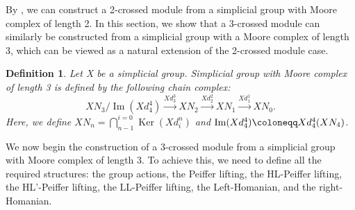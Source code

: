 \documentclass{tac}
\newtheorem{dfn}{Definition}
\begin{document}
By \cite{AkcaPak2010}, we can construct a 2-crossed module from a simplicial group with Moore complex of length 2. In this section, we show that a 3-crossed module can similarly be constructed from a simplicial group with a Moore complex of length 3, which can be viewed as a natural extension of the 2-crossed module case.

\begin{dfn}
Let X be a simplicial group. Simplicial group with Moore complex of length 3 is defined by the following chain complex:
\[
XN_3/{\operatorname{Im} (Xd^4_4)} \xrightarrow{Xd^3_3} XN_2 \xrightarrow{Xd^2_2} XN_1 \xrightarrow{Xd^1_1} XN_0 .
\]
Here, we define $XN_n = \displaystyle\bigcap_{n-1}^{i=0} \operatorname{Ker}(Xd_i^n)$ and ${\rm Im}(Xd^4_4) \coloneqq Xd^4_4(XN_4)$.
\end{dfn}
 
 We now begin the construction of a 3-crossed module from a simplicial group with Moore complex of length 3. To achieve this, we need to define all the required structures: the group actions, the Peiffer lifting, the HL-Peiffer lifting, the HL'-Peiffer lifting, the LL-Peiffer lifting, the Left-Homanian, and the right-Homanian. 
 
\end{document}
